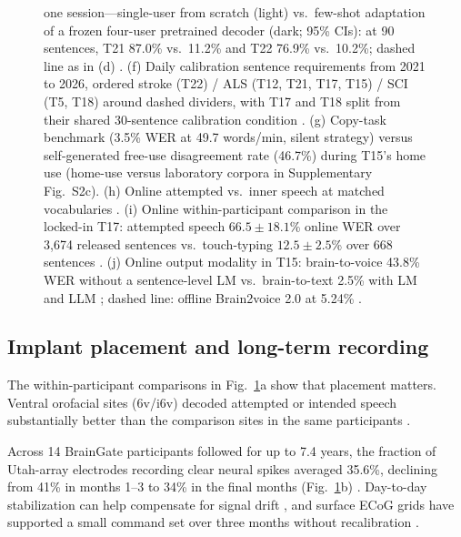 \documentclass[11pt]{article}
\newcommand{\wpm}{words/min}
\begin{document}
\begin{figure}[tp]
{one session---single-user from scratch (light) vs.\ few-shot
adaptation of a frozen four-user pretrained decoder (dark; 95\%
CIs): at 90 sentences, T21 87.0\% vs.\ 11.2\% and T22 76.9\% vs.\
10.2\%; dashed line as in (d) \cite{fogg2026}. (f) Daily calibration
sentence requirements from 2021 to 2026, ordered
stroke (T22) / ALS (T12, T21, T17, T15) / SCI (T5, T18) around dashed
dividers, with T17 and T18 split from their shared 30-sentence
calibration condition
\cite{card2024, jude2026typing, willett2021, fan2023, fogg2026, card2026}.
(g) Copy-task benchmark (3.5\% WER at 49.7 \wpm{}, silent strategy)
versus self-generated free-use disagreement rate (46.7\%) during T15's
home use \cite{card2026} (home-use versus laboratory
corpora in Supplementary Fig.~S2c). (h) Online attempted vs.\ inner
speech at matched vocabularies
\cite{card2024, willett2023, kunz2025, nason2026}. (i) Online
within-participant comparison in the locked-in T17: attempted speech
$66.5\pm18.1$\% online WER over 3{,}674 released sentences
\cite{jude2026lis} vs.\ touch-typing $12.5\pm2.5$\% over 668 sentences
\cite{jude2026typing}. (j) Online output modality in T15:
brain-to-voice 43.8\% WER without a sentence-level LM
\cite{wairagkar2025} vs.\ brain-to-text 2.5\% with LM and LLM
\cite{card2024}; dashed line: offline Brain2voice 2.0 at 5.24\%
\cite{wairagkar2026}.}
\label{fig:clinical}
\end{figure}

\subsection{Implant placement and long-term recording}
\label{sec:implant_durability}

The within-participant comparisons in Fig.~\ref{fig:clinical}a show
that placement matters. Ventral orofacial sites (6v/i6v) decoded
attempted or intended speech substantially better than the comparison
sites in the same participants \cite{willett2023, jude2026lis, kunz2025}.

Across 14 BrainGate participants followed for up to 7.4 years, the fraction of
Utah-array electrodes recording clear neural spikes averaged 35.6\%,
declining from 41\% in months 1--3 to 34\% in the final months
(Fig.~\ref{fig:clinical}b) \cite{hahn2025}. Day-to-day stabilization can help compensate for
signal drift \cite{pun2024, karpowicz2025stab, wilson2025, hosman2023}, and
surface ECoG grids have supported a small command set over three
months without recalibration \cite{luo2023}.
\end{document}
